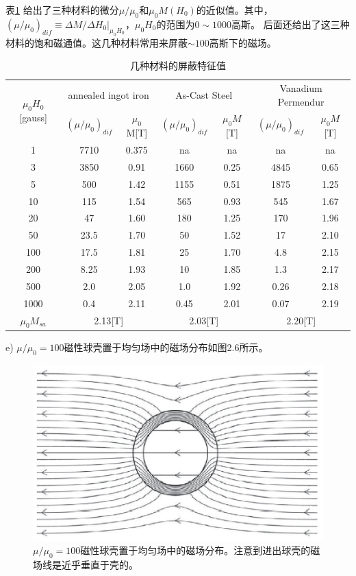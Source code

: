 表\ref{my-label} 给出了三种材料的微分$\mu/\mu_0$和$\mu_0M(H_0)$的近似值。其中，$(\mu/\mu_0)_{dif}\equiv \Delta M/ \Delta H_0 |_{\mu_0 H_0}$，$\mu_0 H_0$的范围为$0\sim 1000$高斯。
后面还给出了这三种材料的饱和磁通值。这几种材料常用来屏蔽$\sim 100$高斯下的磁场。

\begin{table}[]
\centering
\caption{几种材料的屏蔽特征值}
\label{my-label}
\begin{tabular}{|c|c|c|c|c|c|c|}
\hline
\multirow{2}{*}{$\mu_0 H_0$[gauss]} & \multicolumn{2}{c|}{annealed ingot iron} & \multicolumn{2}{c|}{As-Cast Steel} & \multicolumn{2}{c|}{Vanadium Permendur} \\ \cline{2-7}
&$ (\mu/\mu_0)_{dif} $ & $\mu_0 $M[T] & $(\mu/\mu_0)_{dif} $ &$ \mu_0 M$[T] &$ (\mu/\mu_0)_{dif} $ & $\mu_0 M$[T] \\ \hline
1 & 7710 & 0.375 & na & na & na & na \\ \hline
3 & 3850 & 0.91 & 1660 & 0.25 & 4845 & 0.65 \\ \hline
5 & 500 & 1.42 & 1155 & 0.51 & 1875 & 1.25 \\ \hline
10 & 115 & 1.54 & 565 & 0.93 & 545 & 1.67 \\ \hline
20 & 47 & 1.60 & 180 & 1.25 & 170 & 1.96 \\ \hline
50 & 23.5 & 1.70 & 50 & 1.52 & 17 & 2.10 \\ \hline
100 & 17.5 & 1.81 & 25 & 1.70 & 4.8 & 2.15 \\ \hline
200 & 8.25 & 1.93 & 10 & 1.85 & 1.3 & 2.17 \\ \hline
500 & 2.0 & 2.05 & 1.0 & 1.92 & 0.26 & 2.18 \\ \hline
1000 & 0.4 & 2.11 & 0.45 & 2.01 & 0.07 & 2.19 \\ \hline
$\mu_0 M_{sa} $ & \multicolumn{2}{c|}{2.13[T]} & \multicolumn{2}{c|}{2.03[T]} & \multicolumn{2}{c|}{2.20[T]} \\ \hline


\end{tabular}
\end{table}

e) $\mu/\mu_0=100$磁性球壳置于均匀场中的磁场分布如图2.6所示。

\begin{figure}[htbp]
  \centering
 \includegraphics[scale=0.7]{chpt2/figs/fig2.6.eps}
  \caption{$\mu/\mu_0=100$磁性球壳置于均匀场中的磁场分布。注意到进出球壳的磁场线是近乎垂直于壳的。}
\end{figure}



